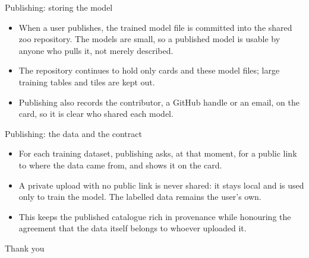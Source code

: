 \documentclass[aspectratio=169]{beamer}
\begin{document}
\begin{frame}{Publishing: storing the model}
\begin{itemize}
  \item When a user publishes, the trained model file is committed into the shared zoo
  repository. The models are small, so a published model is usable by anyone who pulls it,
  not merely described.
  \item The repository continues to hold only cards and these model files; large training
  tables and tiles are kept out.
  \item Publishing also records the contributor, a GitHub handle or an email, on the card, so
  it is clear who shared each model.
\end{itemize}
\end{frame}

\begin{frame}{Publishing: the data and the contract}
\begin{itemize}
  \item For each training dataset, publishing asks, at that moment, for a public link to where
  the data came from, and shows it on the card.
  \item A private upload with no public link is never shared: it stays local and is used only to
  train the model. The labelled data remains the user's own.
  \item This keeps the published catalogue rich in provenance while honouring the agreement that
  the data itself belongs to whoever uploaded it.
\end{itemize}
\end{frame}

\begin{frame}
\centering
\Large Thank you
\end{frame}
\end{document}
